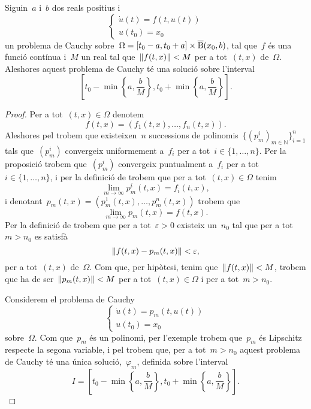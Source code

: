\documentclass[../../main.tex]{subfiles}
\begin{document}
	\begin{theorem}
		\label{thm:Teorema de Peano}
		Siguin~\(a\) i~\(b\) dos reals positius i
		\begin{equation}
			\label{thm:Teorema de Peano:eq3}
			\begin{cases}
				\displaystyle\dot{u}(t)=f(t,u(t)) \\
				\displaystyle u(t_{0})=x_{0}
			\end{cases}
		\end{equation}
		un problema de Cauchy sobre~\(\Omega=[t_{0}-a,t_{0}+a]\times\overline{\operatorname{B}}(x_{0},b)\), tal que~\(f\) és una funció contínua i~\(M\) un real tal que~\(\norm{f(t,x)}<M\) per a tot~\((t,x)\) de~\(\Omega\).
		Aleshores aquest problema de Cauchy té una solució sobre l'interval
		\[
		    \left[t_{0}-\min\left\{a,\frac{b}{M}\right\},t_{0}+\min\left\{a,\frac{b}{M}\right\}\right].
		\]
		\begin{proof} %
			Per a tot~\((t,x)\in\Omega\) denotem
			\[
			    f(t,x)=(f_{1}(t,x),\dots,f_{n}(t,x)).
			\]
			Aleshores pel  trobem que existeixen~\(n\) successions de polinomis~\(\{(p_{m}^{i})_{m\in\mathbb{N}}\}_{i=1}^{n}\) tals que~\((p_{m}^{i})\) convergeix uniformement a~\(f_{i}\) per a tot~\(i\in\{1,\dots,n\}\).
			Per la proposició  trobem que~\((p_{m}^{i})\) convergeix puntualment a~\(f_{i}\) per a tot~\(i\in\{1,\dots,n\}\), i per la definició de  trobem que per a tot~\((t,x)\in\Omega\) tenim
			\[
			    \lim_{m\to\infty}p_{m}^{i}(t,x)=f_{i}(t,x),
			\]
			i denotant~\(p_{m}(t,x)=(p_{m}^{1}(t,x),\dots,p_{m}^{n}(t,x))\) trobem que
			\begin{equation}
				\label{thm:Teorema de Peano:eq2}
				\lim_{m\to\infty}p_{m}(t,x)=f(t,x).
			\end{equation}
			Per la definició de  trobem que per a tot~\(\varepsilon>0\) existeix un~\(n_{0}\) tal que per a tot~\(m>n_{0}\) es satisfà
			\[
			    \norm{f(t,x)-p_{m}(t,x)}<\varepsilon,
			\]
			per a tot~\((t,x)\) de~\(\Omega\).
			Com que, per hipòtesi, tenim que~\(\norm{f(t,x)}<M\), trobem que ha de ser~\(\norm{p_{m}(t,x)}<M\) per a tot~\((t,x)\in\Omega\) i per a tot~\(m>n_{0}\).

			Considerem el problema de Cauchy
			\[\begin{cases}
				\displaystyle\dot{u}(t)=p_{m}(t,u(t)) \\
				\displaystyle u(t_{0})=x_{0}
			\end{cases}\] %
			sobre~\(\Omega\).
			Com que~\(p_{m}\) és un polinomi, per l'exemple  trobem que~\(p_{m}\) és Lipschitz respecte la segona variable, i pel  trobem que, per a tot~\(m>n_{0}\) aquest problema de Cauchy té una única solució,~\(\varphi_{m}\), definida sobre l'interval
			\[
			    I=\left[t_{0}-\min\left\{a,\frac{b}{M}\right\},t_{0}+\min\left\{a,\frac{b}{M}\right\}\right].
			\]


\end{proof}
\end{theorem}
\end{document}
